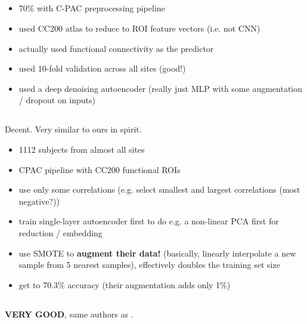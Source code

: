 \documentclass[10pt]{article}
\begin{document}
\subsection{\citet{heinsfeldIdentificationAutismSpectrum2018}}

\begin{itemize}
  \item 70\% with C-PAC preprocessing pipeline
  \item used CC200 atlas to reduce to ROI feature vectors (i.e. not CNN)
  \item actually used functional connectivity as the predictor
  \item used 10-fold validation across all sites (good!)
  \item used a deep denoising autoencoder (really just MLP with some augmentation / dropout on inputs)
\end{itemize}
\subsection{\citet{eslamiASDDiagNetHybridLearning2019}}

Decent. Very similar to ours in spirit.

\begin{itemize}
  \item 1112 subjects from almost all sites
  \item CPAC pipeline with CC200 functional ROIs
  \item use only some correlations (e.g. select smallest and largest correlations (most negative?))
  \item train single-layer autoencoder first to do e.g. a non-linear PCA first for reduction /
  embedding
  \item use SMOTE to \textbf{augment their data!} (basically, linearly interpolate a new sample from
  5 nearest samples), effectively doubles the training set size
  \item get to 70.3\% accuracy (their augmentation adds only 1\%)
\end{itemize}

\subsection{\citet{yinDiagnosisAutismSpectrum2021}}

\textbf{VERY GOOD}, same authors as \citet{mostafaDiagnosisAutismSpectrum2019}.
\end{document}
